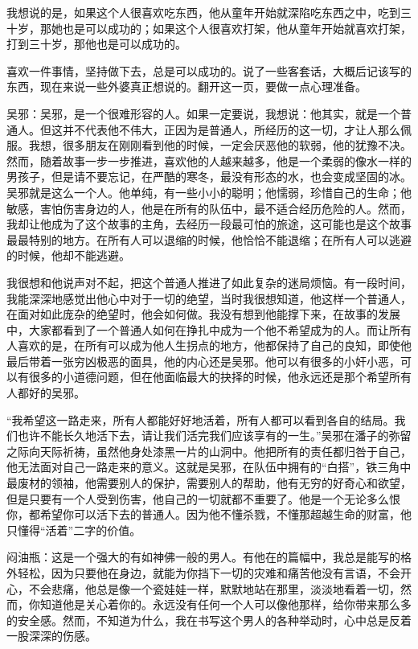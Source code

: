我想说的是，如果这个人很喜欢吃东西，他从童年开始就深陷吃东西之中，吃到三十岁，那她也是可以成功的；如果这个人很喜欢打架，他从童年开始就喜欢打架，打到三十岁，那他也是可以成功的。

喜欢一件事情，坚持做下去，总是可以成功的。说了一些客套话，大概后记该写的东西，现在来说一些外婆真正想说的。翻开这一页，要做一点心理准备。

吴邪：吴邪，是一个很难形容的人。如果一定要说，我想说：他其实，就是一个普通人。但这并不代表他不伟大，正因为是普通人，所经历的这一切，才让人那么佩服。我想，很多朋友在刚刚看到他的时候，一定会厌恶他的软弱，他的犹豫不决。然而，随着故事一步一步推进，喜欢他的人越来越多，他是一个柔弱的像水一样的男孩子，但是请不要忘记，在严酷的寒冬，最没有形态的水，也会变成坚固的冰。吴邪就是这么一个人。他单纯，有一些小小的聪明；他懦弱，珍惜自己的生命；他敏感，害怕伤害身边的人，他是在所有的队伍中，最不适合经历危险的人。然而，我却让他成为了这个故事的主角，去经历一段最可怕的旅途，这可能也是这个故事最最特别的地方。在所有人可以退缩的时候，他恰恰不能退缩；在所有人可以逃避的时候，他却不能逃避。

我很想和他说声对不起，把这个普通人推进了如此复杂的迷局烦恼。有一段时间，我能深深地感觉出他心中对于一切的绝望，当时我很想知道，他这样一个普通人，在面对如此庞杂的绝望时，他会如何做。我没有想到他能撑下来，在故事的发展中，大家都看到了一个普通人如何在挣扎中成为一个他不希望成为的人。而让所有人喜欢的是，在所有可以成为他人生拐点的地方，他都保持了自己的良知，即使他最后带着一张穷凶极恶的面具，他的内心还是吴邪。他可以有很多的小奸小恶，可以有很多的小道德问题，但在他面临最大的抉择的时候，他永远还是那个希望所有人都好的吴邪。

“我希望这一路走来，所有人都能好好地活着，所有人都可以看到各自的结局。我们也许不能长久地活下去，请让我们活完我们应该享有的一生。”吴邪在潘子的弥留之际向天际祈祷，虽然他身处漆黑一片的山洞中。他把所有的责任都归咎于自己，他无法面对自己一路走来的意义。这就是吴邪，在队伍中拥有的“白搭”，铁三角中最废材的领袖，他需要别人的保护，需要别人的帮助，他有无穷的好奇心和欲望，但是只要有一个人受到伤害，他自己的一切就都不重要了。他是一个无论多么恨你，都希望你可以活下去的普通人。因为他不懂杀戮，不懂那超越生命的财富，他只懂得“活着”二字的价值。

闷油瓶：这是一个强大的有如神佛一般的男人。有他在的篇幅中，我总是能写的格外轻松，因为只要他在身边，就能为你挡下一切的灾难和痛苦他没有言语，不会开心，不会悲痛，他总是像一个瓷娃娃一样，默默地站在那里，淡淡地看着一切，然而，你知道他是关心着你的。永远没有任何一个人可以像他那样，给你带来那么多的安全感。然而，不知道为什么，我在书写这个男人的各种举动时，心中总是反着一股深深的伤感。

